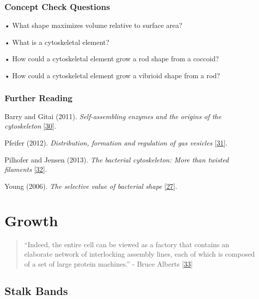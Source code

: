 \documentclass[]{tufte-book}
\begin{document}
\hypertarget{concept-check-questions-2}{%
\subsection*{Concept Check Questions}\label{concept-check-questions-2}}

• What shape maximizes volume relative to surface area?

• What is a cytoskeletal element?

• How could a cytoskeletal element grow a rod shape from a coccoid?

• How could a cytoskeletal element grow a vibrioid shape from a rod?

\hypertarget{further-reading-2}{%
\subsection*{Further Reading}\label{further-reading-2}}

Barry and Gitai (2011). \emph{Self-assembling enzymes and the origins of the cytoskeleton} {[}\protect\hyperlink{ref-barry2011}{30}{]}.

Pfeifer (2012). \emph{Distribution, formation and regulation of gas vesicles} {[}\protect\hyperlink{ref-pfeifer2012}{31}{]}.

Pilhofer and Jensen (2013). \emph{The bacterial cytoskeleton: More than twisted filaments} {[}\protect\hyperlink{ref-pilhofer2013}{32}{]}.

Young (2006). \emph{The selective value of bacterial shape} {[}\protect\hyperlink{ref-young2006}{27}{]}.

\hypertarget{growth}{%
\chapter{Growth}\label{growth}}

\begin{quote}
``Indeed, the entire cell can be viewed as a factory that contains an elaborate network of interlocking assembly lines, each of which is composed of a set of large protein machines.''
- Bruce Alberts {[}\protect\hyperlink{ref-alberts1998}{33}{]}
\end{quote}

\hypertarget{stalk-bands}{%
\section{Stalk Bands}\label{stalk-bands}}
\end{document}
